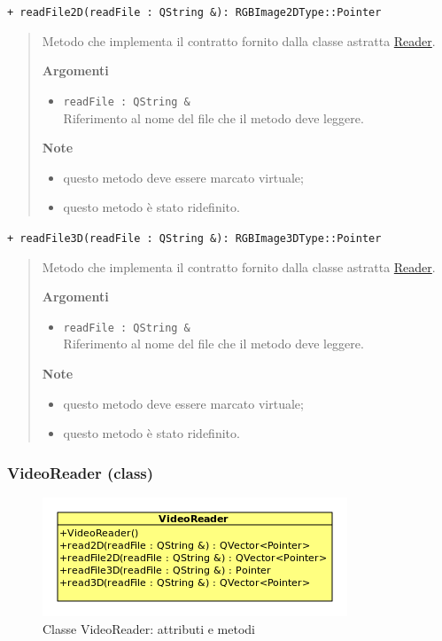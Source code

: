 \color{blue}\verb!+ readFile2D(readFile : QString &): RGBImage2DType::Pointer!
\begin{quote}
\color{black} Metodo che implementa il contratto fornito dalla classe astratta \hyperref[spereader]{Reader}.

\textbf{Argomenti}
\begin{itemize}
\item \verb!readFile : QString &! \\ Riferimento al nome del file che il metodo deve leggere.
\end{itemize}

\textbf{Note}
\begin{itemize}
\item questo metodo deve essere marcato virtuale;
\item questo metodo è stato ridefinito.
\end{itemize} 
\end{quote}
\color{blue}\verb!+ readFile3D(readFile : QString &): RGBImage3DType::Pointer!
\begin{quote}
\color{black} Metodo che implementa il contratto fornito dalla classe astratta \hyperref[spereader]{Reader}.

\textbf{Argomenti}
\begin{itemize}
\item \verb!readFile : QString &! \\ Riferimento al nome del file che il metodo deve leggere.
\end{itemize}

\textbf{Note}
\begin{itemize}
\item questo metodo deve essere marcato virtuale;
\item questo metodo è stato ridefinito.
\end{itemize}
\end{quote} 

\color{black}
\pagebreak

\subsubsection{VideoReader (class)}
\label{spevideoreader}
\begin{figure}[!h]
\centering
			\includegraphics[scale=5]{./Content/Immagini/model/VideoReader.png}
			\caption{Classe VideoReader: attributi e metodi}
			\label{cl_videoreader}
\end{figure}
